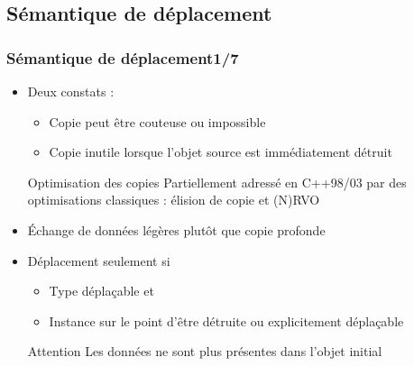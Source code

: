 \documentclass[C++.tex]{subfiles}
\begin{document}
\subsection*{Sémantique de déplacement}
\begin{frame}
	\frametitle{Sémantique de déplacement\titlehfill{}1/7}
	\begin{itemize}
		\item Deux constats :
		\begin{itemize}
			\item Copie peut être couteuse ou impossible


			\item Copie inutile lorsque l'objet source est immédiatement détruit
		\end{itemize}

		\begin{block}{Optimisation des copies}
			Partiellement adressé en C++98/03 par des optimisations classiques : élision de copie et (N)RVO 

		\end{block}

		\item \og Échange\fg{} de données légères plutôt que copie profonde


		\item Déplacement seulement si
		\begin{itemize}
			\item Type déplaçable et
			\item Instance sur le point d'être détruite ou explicitement déplaçable
		\end{itemize}

		\begin{alertblock}{Attention}
			Les données ne sont plus présentes dans l'objet initial
		\end{alertblock}
	\end{itemize}
\end{frame}
\end{document}
